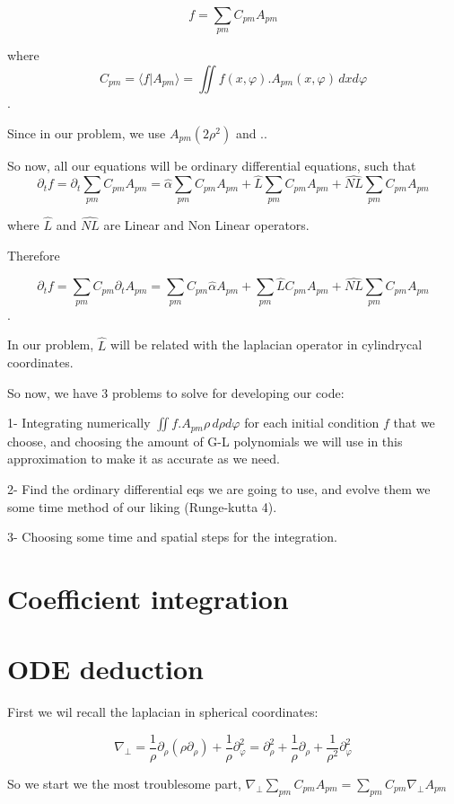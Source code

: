\documentclass[a4paper,11pt,spanish,sans]{exam}
\begin{document}
\[f=\sum_{pm}C_{pm}A_{pm}\]

where \[C_{pm}=\langle f | A_{pm}\rangle=\iint f(x,\varphi).A_{pm}(x,\varphi) \, d\!x d\!\varphi  \].

Since in our problem, we use $A_{pm}(2\rho^2)$ and ..

So now, all our equations will be ordinary differential equations, such that 
\[\partial_t f= \partial_t \sum_{pm}C_{pm}A_{pm}= \hat{\alpha} \sum_{pm}C_{pm}A_{pm} +\hat{L}\sum_{pm}C_{pm}A_{pm} + \hat{NL}\sum_{pm}C_{pm}A_{pm}    \]

where $\hat{L}$ and $\hat{NL} $ are Linear and Non Linear operators.

Therefore 

\[\partial_t f= \sum_{pm}C_{pm} \partial_t A_{pm}= \sum_{pm}C_{pm} \hat{\alpha} A_{pm} +\sum_{pm} \hat{L}C_{pm}A_{pm} + \hat{NL}\sum_{pm}C_{pm}A_{pm} \].

In our problem, $\hat{L}$ will be related with the laplacian operator in cylindrycal coordinates.

So now, we have 3 problems to solve for developing our code: 

1- Integrating numerically $\iint f.A_{pm}\rho \, d\!\rho d\!\varphi $ for each initial condition $f$ that we choose, and choosing the amount of G-L polynomials we will use in this approximation to make it as accurate as we need.

2- Find the ordinary differential eqs we are going to use, and evolve them we some time method of our liking (Runge-kutta 4).

3- Choosing some time and spatial steps for the integration.

\section{Coefficient integration}

\section{ODE deduction}

First we wil recall the laplacian in spherical coordinates:

\[ \nabla_{\bot}=\frac{1}{\rho}\partial_{\rho}(\rho\partial_{\rho}) +\frac{1}{\rho}\partial^2_{\varphi} =\partial^2_{\rho}+\frac{1}{\rho}\partial_{\rho} +\frac{1}{\rho^2}\partial^2_{\varphi}  \]

So we start we the most troublesome part, $\nabla_{\bot}\sum_{pm}C_{pm}A_{pm}=\sum_{pm}C_{pm}\nabla_{\bot}A_{pm}$
\end{document}
